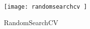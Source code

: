 	\begin{figure}[tbh]
		\centering
		\texttt{[image: randomsearchcv ]}
		\caption[RandomSearchCV]{RandomSearchCV}
		\label{fig:randomsearchcv}
	\end{figure} 